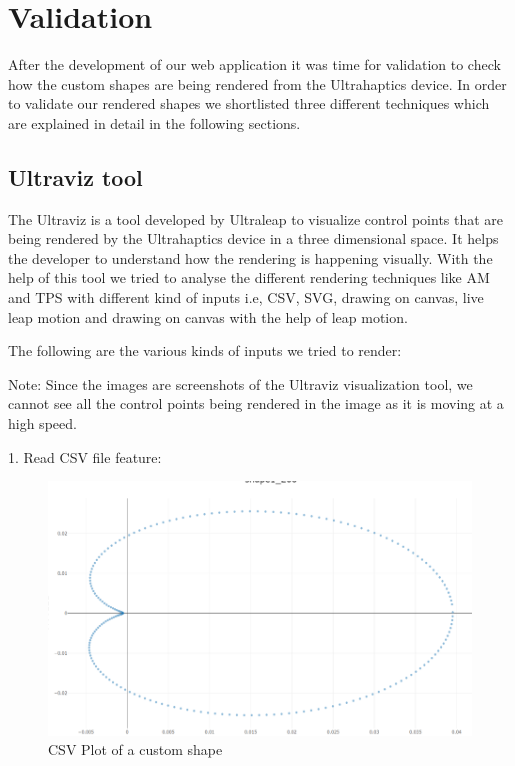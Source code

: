 
\chapter{Validation}
\label{sec:validation}

After the development of our web application it was time for validation to check how the custom shapes are being rendered from the Ultrahaptics device. In order to validate our rendered shapes we shortlisted three different techniques which are explained in detail in the following sections.


\section{Ultraviz tool}
\label{sec:validation:ultraviz}

The Ultraviz is a tool developed by Ultraleap \cite{ul}\cite{ultraviz} to visualize control points that are being rendered by the Ultrahaptics device in a three dimensional space. It helps the developer to understand how the rendering is happening visually. With the help of this tool we tried to analyse the different rendering techniques like AM and TPS with different kind of inputs i.e, CSV, SVG, drawing on canvas, live leap motion and drawing on canvas with the help of leap motion. 

The following are the various kinds of inputs we tried to render:

Note: Since the images are screenshots of the Ultraviz visualization tool, we cannot see all the control points being rendered in the image as it is moving at a high speed.

1. Read CSV file feature:
\begin{figure}[htb]
	\includegraphics[width=\textwidth]{gfx/Read CSV Image.png}
	\caption{CSV Plot of a custom shape}
	\label{fig:validation:csv}
\end{figure}

